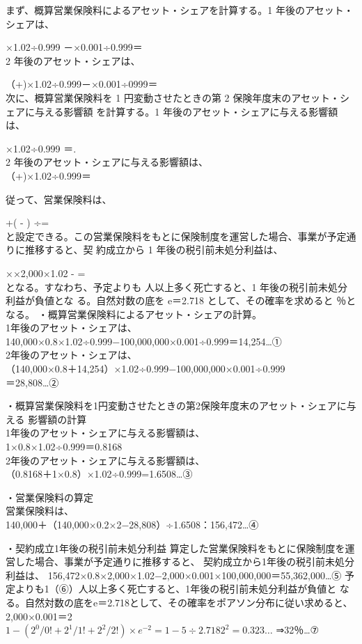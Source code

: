 \documentclass[report,gutter=10mm,fore-edge=10mm,uplatex,dvipdfmx]{jlreq}
\begin{document}
まず、概算営業保険料によるアセット・シェアを計算する。1 年後のアセット・シェアは、\par
\framebox[3zw]{　} ×1.02÷0.999 －\framebox[3zw]{　}×0.001÷0.999＝\\
2 年後のアセット・シェアは、\par
（\framebox[3zw]{　}+\framebox[3zw]{　})×1.02÷0.999－\framebox[3zw]{　}×0.001÷0999＝\\
次に、概算営業保険料を 1 円変動させたときの第 2 保険年度末のアセット・シェアに与える影響額
を計算する。1 年後のアセット・シェアに与える影響額は、\par
\framebox[3zw]{　}×1.02÷0.999 ＝\framebox[3zw]{　}.\\
2 年後のアセット・シェアに与える影響額は、\\
（\framebox[3zw]{　}+\framebox[3zw]{　})×1.02÷0.999＝\par
従って、営業保険料は、\par
\framebox[3zw]{　}+(\framebox[3zw]{　} - \framebox[3zw]{　}) ÷\framebox[3zw]{　}=\\
と設定できる。この営業保険料をもとに保険制度を運営した場合、事業が予定通りに推移すると、契
約成立から 1 年後の税引前未処分利益は、\par
\framebox[3zw]{　}×\framebox[3zw]{　}×2,000×1.02 -\framebox[3zw]{　} = \\
となる。すなわち、予定よりも
人以上多く死亡すると、1 年後の税引前未処分利益が負値とな
る。自然対数の底を e＝2.718 として、その確率を求めると
％となる。
\answer{}
・概算営業保険料によるアセット・シェアの計算。\\
1年後のアセット・シェアは、\\
140,000×0.8×1.02÷0.999−100,000,000×0.001÷0.999＝14,254…①\\
2年後のアセット・シェアは、\\
（140,000×0.8＋14,254）×1.02÷0.999−100,000,000×0.001÷0.999\\
＝28,808…②

・概算営業保険料を1円変動させたときの第2保険年度末のアセット・シェアに与える
影響額の計算\\
1年後のアセット・シェアに与える影響額は、\\
1×0.8×1.02÷0.999＝0.8168\\
2年後のアセット・シェアに与える影響額は、\\
（0.8168＋1×0.8）×1.02÷0.999=1.6508…③

・営業保険料の算定\\
営業保険料は、\\
140,000＋（140,000×0.2×2−28,808）÷1.6508：156,472…④

・契約成立1年後の税引前未処分利益
算定した営業保険料をもとに保険制度を運営した場合、事業が予定通りに推移すると、
契約成立から1年後の税引前未処分利益は、
156,472×0.8×2,000×1.02−2,000×0.001×100,000,000＝55,362,000…⑤
予定よりも1（⑥）人以上多く死亡すると、1年後の税引前未処分利益が負値と
なる。自然対数の底をe＝2.718として、その確率をポアソン分布に従い求めると、\\
2,000×0.001＝2\\
$1-(2^0/0!+2^1/1!+2^2/2!)×e^{−2}=1−5\div2.7182^2=0.323…$
⇒32％…⑦
\end{document}
